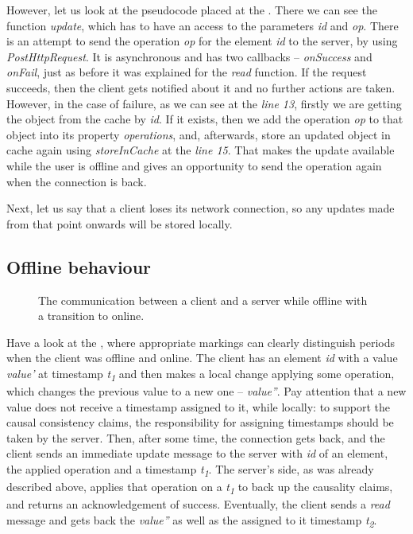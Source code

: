 However, let us look at the pseudocode placed at the . There we can see the function \textit{update}, which has to have an access to the parameters \textit{id} and \textit{op}. There is an attempt to send the operation \textit{op} for the element \textit{id} to the server, by using \textit{PostHttpRequest}. It is asynchronous and has two callbacks -- \textit{onSuccess} and \textit{onFail}, just as before it was explained for the \textit{read} function. If the request succeeds, then the client gets notified about it and no further actions are taken. However, in the case of failure, as we can see at the \textit{line 13}, firstly we are getting the object from the cache by \textit{id}. If it exists, then we add the operation \textit{op} to that object into its property \textit{operations}, and, afterwards, store an updated object in cache again using \textit{storeInCache} at the \textit{line 15}. That makes the update available while the user is offline and gives an opportunity to send the operation again when the connection is back.

Next, let us say that a client loses its network connection, so any updates made from that point onwards will be stored locally.  

\subsection*{Offline behaviour}

\begin{figure}[!htb]
    \begin{center}
    \def\svgwidth{\linewidth}
    
    \caption {The communication between a client and a server while offline with a transition to online.}
    \label{fig:design4}
\end{center}
\end{figure}

Have a look at the , where appropriate markings can clearly distinguish periods when the client was offline and online. The client has an element \textit{id} with a value \textit{value'} at timestamp \textit{t\textsubscript{1}} and then makes a local change applying some operation, which changes the previous value to a new one -- \textit{value''}. Pay attention that a new value does not receive a timestamp assigned to it, while locally: to support the causal consistency claims, the responsibility for assigning timestamps should be taken by the server. Then, after some time, the connection gets back, and the client sends an immediate update message to the server with \textit{id} of an element, the applied operation and a timestamp \textit{t\textsubscript{1}}. The server's side, as was already described above, applies that operation on a \textit{t\textsubscript{1}} to back up the causality claims, and returns an acknowledgement of success. Eventually, the client sends a \textit{read} message and gets back the \textit{value''} as well as the assigned to it timestamp \textit{t\textsubscript{2}}.

